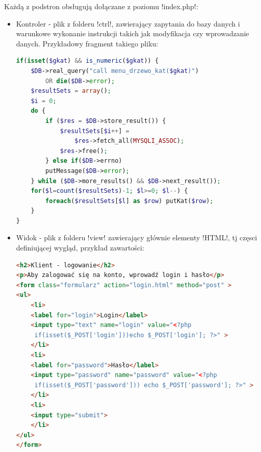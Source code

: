 Każdą z podstron obsługują dołączane z poziomu \s!index.php!:
\begin{itemize}
	\item Kontroler - plik z folderu \s!ctrl!, zawierający zapytania do bazy danych i warunkowe wykonanie instrukcji takich jak modyfikacja czy wprowadzanie danych. Przykładowy fragment takiego pliku:
\begin{lstlisting}[language=PHP]
if(isset($gkat) && is_numeric($gkat)) {
	$DB->real_query("call menu_drzewo_kat($gkat)") 
		OR die($DB->error);
	$resultSets = array();
	$i = 0;
	do {
		if ($res = $DB->store_result()) {
			$resultSets[$i++] = 
				$res->fetch_all(MYSQLI_ASSOC);
			$res->free();
		} else if($DB->errno)
		putMessage($DB->error);
	} while ($DB->more_results() && $DB->next_result());
	for($l=count($resultSets)-1; $l>=0; $l--) {
		foreach($resultSets[$l] as $row) putKat($row);
	}
}
\end{lstlisting}
	\item Widok - plik z folderu \s!view! zawierający głównie elementy \s!HTML!, tj częsci definiującej wygląd, przykład zawartości:
\begin{lstlisting}[language=HTML,showstringspaces=false]
<h2>Klient - logowanie</h2>
<p>Aby zalogować się na konto, wprowadź login i hasło</p>
<form class="formularz" action="login.html" method="post" >
<ul>
	<li>
	<label for="login">Login</label>
	<input type="text" name="login" value="<?php
	 if(isset($_POST['login']))echo $_POST['login']; ?>" >
	</li>
	<li>
	<label for="password">Hasło</label>
	<input type="password" name="password" value="<?php
	 if(isset($_POST['password'])) echo $_POST['password']; ?>" >
	</li>
	<li>
	<input type="submit">
	</li>
</ul>
</form>
\end{lstlisting}
\end{itemize}



